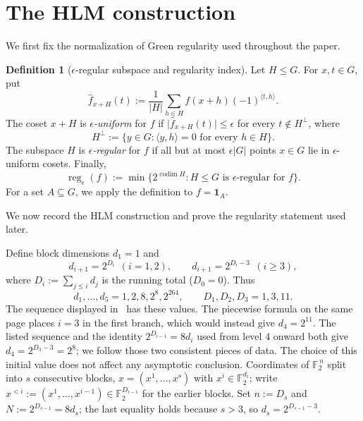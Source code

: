 \documentclass[11pt]{article}
\theoremstyle{plain}
\theoremstyle{definition}
\newtheorem{definition}[theorem]{Definition}
\numberwithin{theorem}{section}
\newcommand{\F}{\mathbb{F}}
\newcommand{\inner}[2]{\langle #1,#2\rangle}
\newcommand{\abs}[1]{\lvert #1\rvert}
\newcommand{\reg}{\operatorname{reg}}
\newcommand{\codim}{\operatorname{codim}}
\begin{document}
\section{The HLM construction}\label{sec:hlm}

We first fix the normalization of Green regularity used throughout the
paper.

\begin{definition}[$\epsilon$-regular subspace and regularity index]\label{def:reg}
Let $H\le G$.  For $x,t\in G$, put
\[
  \widehat f_{x+H}(t):=\frac1{\abs H}
  \sum_{h\in H}f(x+h)(-1)^{\inner{t}{h}}.
\]
The coset $x+H$ is \emph{$\epsilon$-uniform} for $f$ if
$\abs{\widehat f_{x+H}(t)}\le\epsilon$ for every $t\notin H^\perp$, where
\[
  H^\perp:=\{y\in G:\inner{y}{h}=0\text{ for every }h\in H\}.
\]
The subspace $H$ is \emph{$\epsilon$-regular} for $f$ if all but at most
$\epsilon\abs G$ points $x\in G$ lie in $\epsilon$-uniform cosets.  Finally,
\[
  \reg_\epsilon(f):=
  \min\{2^{\codim H}:H\le G\text{ is $\epsilon$-regular for }f\}.
\]
For a set $A\subseteq G$, we apply the definition to $f=\mathbf 1_A$.
\end{definition}

We now record the HLM construction and prove the regularity statement used
later.

Define block dimensions $d_1=1$ and
\[
  d_{i+1}=2^{D_i}\ \ (i=1,2),\qquad d_{i+1}=2^{D_i-3}\ \ (i\ge3),
\]
where $D_i:=\sum_{j\le i}d_j$ is the running total ($D_0=0$).  Thus
\[
  d_1,\dots,d_5=1,2,8,2^8,2^{264},
  \qquad D_1,D_2,D_3=1,3,11.
\]
The sequence displayed in~\cite[\S2.1]{HLM} has these values.  The
piecewise formula on the same page places $i=3$ in the first branch, which
would instead give $d_4=2^{11}$.  The listed sequence and the identity
$2^{D_{i-1}}=8d_i$ used from level $4$ onward both give
$d_4=2^{D_3-3}=2^8$; we follow those two consistent pieces of data.  The
choice of this initial value does not affect any asymptotic conclusion.
Coordinates of $\F_2^{\,n}$ split into $s$ consecutive blocks,
$x=(x^1,\dots,x^s)$ with $x^i\in\F_2^{d_i}$; write
$x^{<i}:=(x^1,\dots,x^{i-1})\in\F_2^{D_{i-1}}$ for the earlier blocks. Set
$n:=D_s$ and $N:=2^{D_{s-1}}=8d_s$; the last equality holds because $s>3$, so
$d_s=2^{D_{s-1}-3}$.
\end{document}
